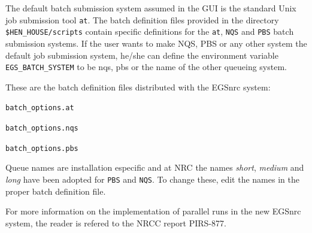 \documentclass[12pt,twoside]{article}   %
\begin{document}
The default batch submission system assumed in the GUI is the standard Unix
job submission tool {\tt at}. The batch definition files provided in the directory
{\tt \$HEN\_HOUSE/scripts} contain specific definitions for the {\tt at},
{\tt NQS} and {\tt PBS} batch submission systems. If the user wants to make NQS, PBS or
any other system the default job submission system,
he/she can define the environment variable {\tt EGS\_BATCH\_SYSTEM} to be nqs, pbs or
the name of the other queueing system.

These are the batch definition files distributed with the EGSnrc system:
\begin{description}
\item {\tt batch\_options.at}
\item {\tt batch\_options.nqs}
\item {\tt batch\_options.pbs}
\end{description}

Queue names are installation especific and at NRC the
names {\em short}, {\em medium} and {\em long} have been adopted for {\tt PBS} and {\tt NQS}.
To change these, edit the names
in the proper batch definition file.

For more information on the implementation of parallel runs in the new EGSnrc system, the reader
is refered to the NRCC report PIRS-877.
\end{document}
